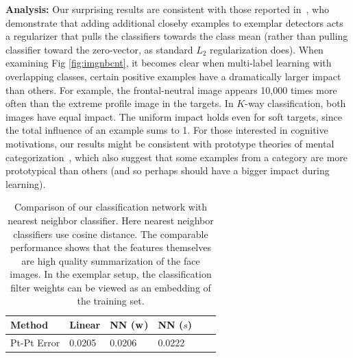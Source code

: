 \documentclass[letterpaper]{article} %
\begin{document}
{\bf Analysis:} Our surprising results are consistent with those reported in~\cite{zhu2014capturing}, who demonstrate that adding additional closeby examples to exemplar detectors acts a regularizer that pulls the classifiers towards the class mean (rather than pulling classifier toward the zero-vector, as standard $L_2$ regularization does). When examining Fig \ref{fig:imgnbcnt}, it becomes clear when multi-label learning with overlapping classes, certain positive examples have a dramatically larger impact than others. For example, the frontal-neutral image appears 10,000 times more often than the extreme profile image in the targets. In $K$-way classification, both images have equal impact. The uniform impact holds even for soft targets, since the total influence of an example sums to 1. For those interested in cognitive motivations, our results might be consistent with prototype theories of mental categorization~\cite{rosch1978cognition}, which also suggest that some examples from a category are more prototypical than others (and so perhaps should have a bigger impact during learning).


\begin{table}[t]
\centering
\begin{tabular}{l|lllll} \hline
Method     & Linear & NN (${\bf w}$) & NN ($s$) \\ \hline
Pt-Pt Error & 0.0205 & 0.0206   & 0.0222 \\ \hline
\end{tabular}
\caption{Comparison of our classification network with nearest neighbor classifier. Here nearest neighbor classifiers use cosine distance. The comparable performance shows that the features themselves are high quality summarization of the face images. In the exemplar setup, the classification filter weights can be viewed as an embedding of the training set.}
\label{tab:nn}
\end{table}
\end{document}
